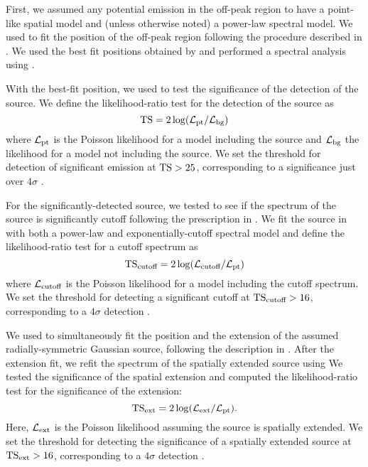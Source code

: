 First, we assumed any potential emission in the off-peak region 
to have a point-like
spatial model and (unless otherwise noted) a power-law spectral model.
We used \pointlike to fit the position of the off-peak region following
the procedure described in \cite{LAT_Collaboration_2FGL_2012}.  We used
the best fit positions obtained by \pointlike and performed a
spectral analysis using \gtlike.

With the best-fit position, we used \gtlike to 
test the significance of the detection of the source.
We define the 
likelihood-ratio test for the detection of the source as
\begin{equation}
  \text{TS} = 2 \log(\mathcal{L}_\text{pt}/\mathcal{L}_\text{bg})
\end{equation}
where $\mathcal{L}_\text{pt}$ is the Poisson likelihood for a model
including the source and $\mathcal{L}_\text{bg}$ the likelihood for a
model not including the source.  We set the threshold for detection of
significant emission at $\text{TS}>25$, corresponding to a significance just
over $4\sigma$ \citep{LAT_Collaboration_1FGL_2010}.

For the significantly-detected source, we tested to see if the spectrum of the
source is significantly cutoff following the prescription in
\cite{LAT_collaboration_PWNCAT_2011}. 
We fit the source in \gtlike 
with both a power-law and exponentially-cutoff spectral model
and define the likelihood-ratio test for a cutoff spectrum as
\begin{equation}
  \text{TS}_\text{cutoff}= 2 \log(\mathcal{L}_\text{cutoff}/\mathcal{L}_\text{pt})
\end{equation}
where $\mathcal{L}_\text{cutoff}$ is the Poisson likelihood for a model
including the cutoff spectrum.  We set the threshold
for detecting a significant cutoff at $\text{TS}_\text{cutoff}>16$, corresponding to a
$4\sigma$ detection \citep{LAT_collaboration_PWNCAT_2011} .

We used \pointlike to simultaneously fit the position and the
extension of the assumed radially-symmetric Gaussian source, following the description in
\citep{LAT_collaboration_extended_search_2012}.  
After the extension fit,
we refit the spectrum of the spatially extended source using \gtlike
We tested the significance of the spatial extension
and computed the likelihood-ratio test for the significance of the extension:
\begin{equation}
  \text{TS}_\text{ext} = 2 \log(\mathcal{L}_\text{ext}/\mathcal{L}_\text{pt}).
\end{equation}
Here, $\mathcal{L}_\text{ext}$ is the Poisson likelihood assuming the
source is spatially extended. We set the threshold for detecting the
significance of a spatially extended source at $\text{TS}_\text{ext}>16$, corresponding
to a $4\sigma$ detection \citep{LAT_collaboration_extended_search_2012}.

